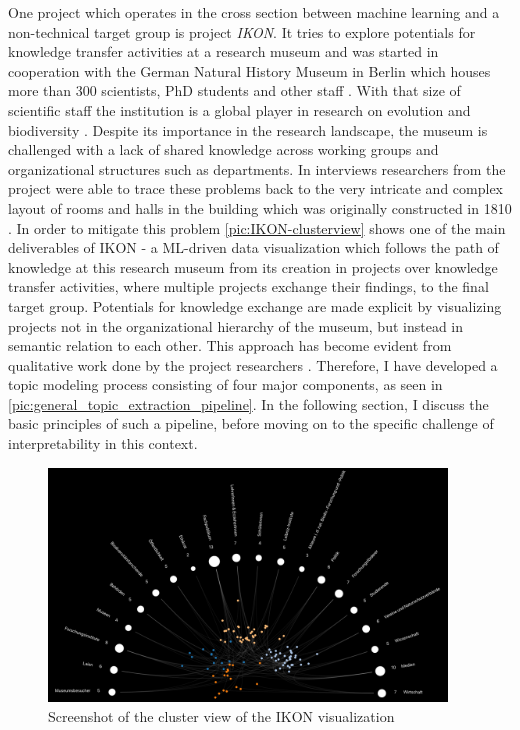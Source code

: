 One project which operates in the cross section between machine learning and a non-technical target group is project \textit{IKON}. It tries to explore potentials for knowledge transfer activities at a research museum and was started in cooperation with the German Natural History Museum in Berlin which houses more than 300 scientists, PhD students and other staff \cite{Team2018}. With that size of scientific staff the institution is a global player in research on evolution and biodiversity \cite{IntroducingMuseumFur}. Despite its importance in the research landscape, the museum is challenged with a lack of shared knowledge across working groups and organizational structures such as departments\cite{benjamin_understanding_2019}. In interviews researchers from the project were able to trace these problems back to the very intricate and complex layout of rooms and halls in the building which was originally constructed in 1810 \cite{140JahreAltes2018}. In order to mitigate this problem \autoref{pic:IKON-clusterview} shows one of the main deliverables of IKON - a ML-driven data visualization which follows the path of knowledge at this research museum from its creation in projects over knowledge transfer activities, where multiple projects exchange their findings, to the final target group. Potentials for knowledge exchange are made explicit by visualizing projects not in the organizational hierarchy of the museum, but instead in semantic relation to each other. This approach has become evident from qualitative work done by the project researchers \cite{benjamin_understanding_2019}. Therefore, I have developed a topic modeling process consisting of four major components, as seen in \autoref{pic:general_topic_extraction_pipeline}. In the following section, I discuss the basic principles of such a pipeline, before moving on to the specific challenge of interpretability in this context.

\begin{figure}[htpb!]
	\centering
	\includegraphics[width=400px]{../chapters/introduction/graphics/ikon-clusterview}
	\caption{\label{pic:IKON-clusterview} Screenshot of the cluster view of the IKON visualization}
\end{figure}

